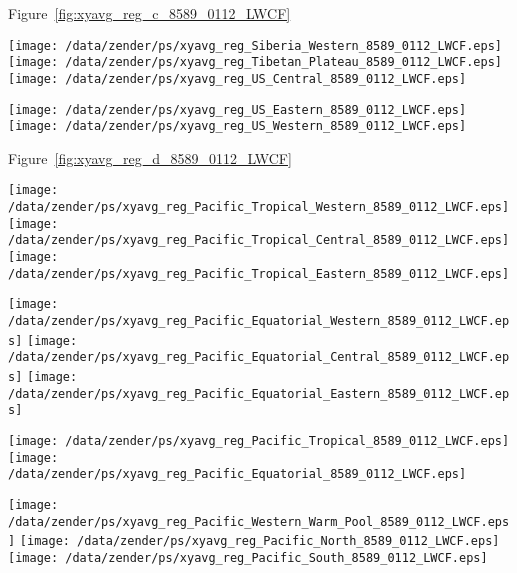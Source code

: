 \documentclass[agupp]{aguplus}
\begin{document}
Figure~\ref{fig:xyavg_reg_c_8589_0112_LWCF}
\begin{figure*}
\texttt{[image: /data/zender/ps/xyavg\_reg\_Siberia\_Western\_8589\_0112\_LWCF.eps]}%
\texttt{[image: /data/zender/ps/xyavg\_reg\_Tibetan\_Plateau\_8589\_0112\_LWCF.eps]}%
\texttt{[image: /data/zender/ps/xyavg\_reg\_US\_Central\_8589\_0112\_LWCF.eps]}%

\texttt{[image: /data/zender/ps/xyavg\_reg\_US\_Eastern\_8589\_0112\_LWCF.eps]}%
\texttt{[image: /data/zender/ps/xyavg\_reg\_US\_Western\_8589\_0112\_LWCF.eps]}%

\caption{Seasonal amplitude in regional longwave cloud
forcing (\wxmS ) for ERBE, CCM, and ANV. Month 1 is January. 
\label{fig:xyavg_reg_c_8589_0112_LWCF}}   
\end{figure*}

Figure~\ref{fig:xyavg_reg_d_8589_0112_LWCF}
\begin{figure*}
\texttt{[image: /data/zender/ps/xyavg\_reg\_Pacific\_Tropical\_Western\_8589\_0112\_LWCF.eps]}%
\texttt{[image: /data/zender/ps/xyavg\_reg\_Pacific\_Tropical\_Central\_8589\_0112\_LWCF.eps]}%
\texttt{[image: /data/zender/ps/xyavg\_reg\_Pacific\_Tropical\_Eastern\_8589\_0112\_LWCF.eps]}%

\texttt{[image: /data/zender/ps/xyavg\_reg\_Pacific\_Equatorial\_Western\_8589\_0112\_LWCF.eps]}%
\texttt{[image: /data/zender/ps/xyavg\_reg\_Pacific\_Equatorial\_Central\_8589\_0112\_LWCF.eps]}%
\texttt{[image: /data/zender/ps/xyavg\_reg\_Pacific\_Equatorial\_Eastern\_8589\_0112\_LWCF.eps]}%

\texttt{[image: /data/zender/ps/xyavg\_reg\_Pacific\_Tropical\_8589\_0112\_LWCF.eps]}%
\texttt{[image: /data/zender/ps/xyavg\_reg\_Pacific\_Equatorial\_8589\_0112\_LWCF.eps]}%

\texttt{[image: /data/zender/ps/xyavg\_reg\_Pacific\_Western\_Warm\_Pool\_8589\_0112\_LWCF.eps]}%
\texttt{[image: /data/zender/ps/xyavg\_reg\_Pacific\_North\_8589\_0112\_LWCF.eps]}%
\texttt{[image: /data/zender/ps/xyavg\_reg\_Pacific\_South\_8589\_0112\_LWCF.eps]}%

\caption{Seasonal amplitude in regional longwave cloud
forcing (\wxmS ) for ERBE, CCM, and ANV. Month 1 is January. 
\label{fig:xyavg_reg_d_8589_0112_LWCF}}   
\end{figure*}

\end{document}
